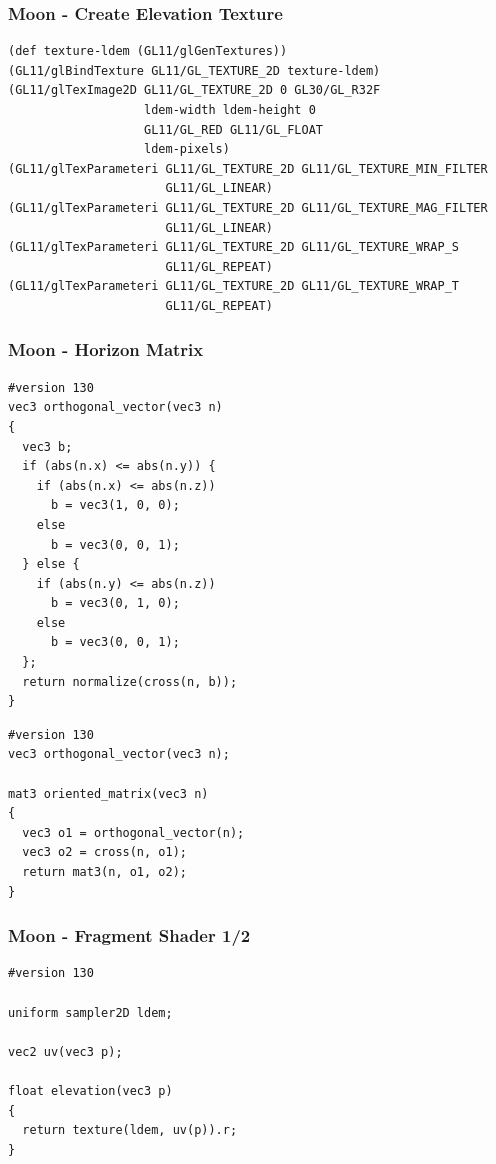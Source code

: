 \documentclass[aspectratio=169,11pt,xcolor=dvipsnames]{beamer}
\begin{document}
\begin{frame}[fragile]
  \frametitle{Moon {-} Create Elevation Texture}
  \begin{verbatim}
(def texture-ldem (GL11/glGenTextures))
(GL11/glBindTexture GL11/GL_TEXTURE_2D texture-ldem)
(GL11/glTexImage2D GL11/GL_TEXTURE_2D 0 GL30/GL_R32F
                   ldem-width ldem-height 0
                   GL11/GL_RED GL11/GL_FLOAT
                   ldem-pixels)
(GL11/glTexParameteri GL11/GL_TEXTURE_2D GL11/GL_TEXTURE_MIN_FILTER
                      GL11/GL_LINEAR)
(GL11/glTexParameteri GL11/GL_TEXTURE_2D GL11/GL_TEXTURE_MAG_FILTER
                      GL11/GL_LINEAR)
(GL11/glTexParameteri GL11/GL_TEXTURE_2D GL11/GL_TEXTURE_WRAP_S
                      GL11/GL_REPEAT)
(GL11/glTexParameteri GL11/GL_TEXTURE_2D GL11/GL_TEXTURE_WRAP_T
                      GL11/GL_REPEAT)
  \end{verbatim}
\end{frame}

\begin{frame}[fragile]
  \frametitle{Moon {-} Horizon Matrix}
  \begin{minipage}[t]{.48\textwidth}
    \begin{verbatim}
#version 130
vec3 orthogonal_vector(vec3 n)
{
  vec3 b;
  if (abs(n.x) <= abs(n.y)) {
    if (abs(n.x) <= abs(n.z))
      b = vec3(1, 0, 0);
    else
      b = vec3(0, 0, 1);
  } else {
    if (abs(n.y) <= abs(n.z))
      b = vec3(0, 1, 0);
    else
      b = vec3(0, 0, 1);
  };
  return normalize(cross(n, b));
}
    \end{verbatim}
  \end{minipage}
  \begin{minipage}[t]{.48\textwidth}
    \begin{verbatim}
#version 130
vec3 orthogonal_vector(vec3 n);

mat3 oriented_matrix(vec3 n)
{
  vec3 o1 = orthogonal_vector(n);
  vec3 o2 = cross(n, o1);
  return mat3(n, o1, o2);
}
    \end{verbatim}
  \end{minipage}
\end{frame}

\begin{frame}[fragile]
  \frametitle{Moon {-} Fragment Shader 1/2}
  \begin{verbatim}
#version 130

uniform sampler2D ldem;

vec2 uv(vec3 p);

float elevation(vec3 p)
{
  return texture(ldem, uv(p)).r;
}
  \end{verbatim}
\end{frame}
\end{document}
